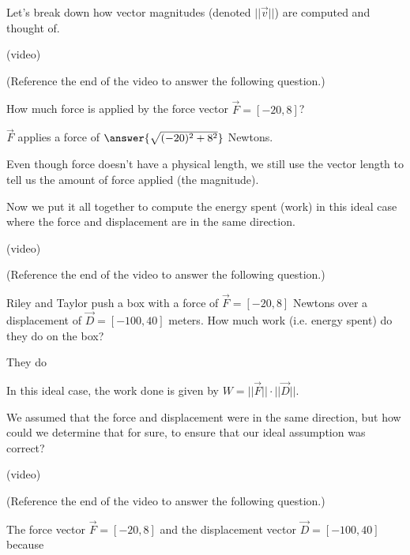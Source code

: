 \documentclass{ximera}
\begin{document}
Let's break down how vector magnitudes (denoted $||\vec{v}||$) are computed and thought of.

(video)

\begin{problem}
    (Reference the end of the video to answer the following question.)

    How much force is applied by the force vector $\vec{F}=[-20,8]$?

    $\vec{F}$ applies a force of $\answer{\sqrt{(-20)^2+8^2}}$ Newtons.

    \begin{feedback}
        Even though force doesn't have a physical length, we still use the vector length to tell us the amount of force applied (the magnitude).
    \end{feedback}
\end{problem}

Now we put it all together to compute the energy spent (work) in this ideal case where the force and displacement are in the same direction.

(video)

\begin{problem}
    (Reference the end of the video to answer the following question.)

    Riley and Taylor push a box with a force of $\vec{F}=[-20,8]$ Newtons over a displacement of $\vec{D}=[-100,40]$ meters. How much work (i.e. energy spent) do they do on the box?

    They do 

    \begin{multipleChoice}
    \end{multipleChoice}

    \begin{feedback}
        In this ideal case, the work done is given by $W=||\vec{F}||\cdot||\vec{D}||$.
    \end{feedback}

\end{problem}

We assumed that the force and displacement were in the same direction, but how could we determine that for sure, to ensure that our ideal assumption was correct?

(video)

\begin{problem}
    (Reference the end of the video to answer the following question.)

    The force vector $\vec{F}=[-20,8]$ and the displacement vector $\vec{D}=[-100,40]$  because 
\end{problem}
\end{document}
